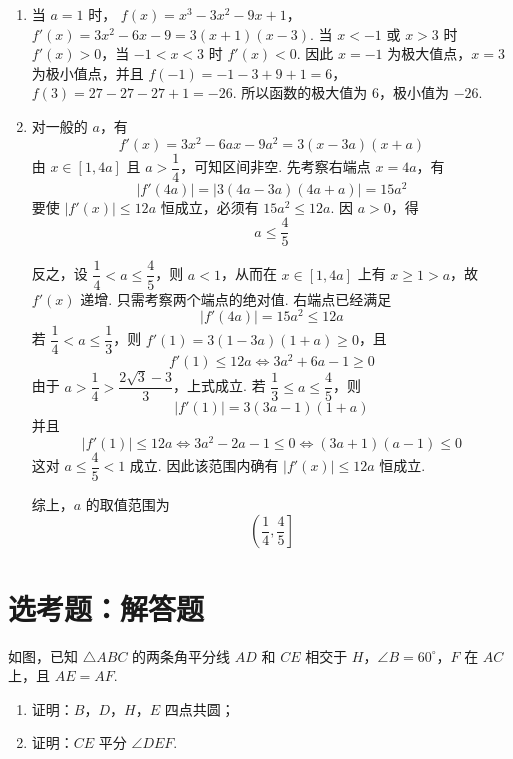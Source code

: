 \begin{solution}
\begin{enumerate}
\item 当 \(a=1\) 时，
\(f(x)=x^3-3x^2-9x+1\)，\(f'(x)=3x^2-6x-9=3(x+1)(x-3)\).
当 \(x<-1\) 或 \(x>3\) 时 \(f'(x)>0\)，当 \(-1<x<3\) 时 \(f'(x)<0\). 因此 \(x=-1\) 为极大值点，\(x=3\) 为极小值点，并且
\(f(-1)=-1-3+9+1=6\)，\(f(3)=27-27-27+1=-26\).
所以函数的极大值为 \(6\)，极小值为 \(-26\).

\item 对一般的 \(a\)，有
\[
f'(x)=3x^2-6ax-9a^2=3(x-3a)(x+a)
\]
由 \(x\in[1,4a]\) 且 \(a>\dfrac14\)，可知区间非空. 先考察右端点 \(x=4a\)，有
\[
|f'(4a)|=|3(4a-3a)(4a+a)|=15a^2
\]
要使 \(|f'(x)|\leqslant12a\) 恒成立，必须有 \(15a^2\leqslant12a\). 因 \(a>0\)，得
\[
a\leqslant\frac45
\]

反之，设 \(\dfrac14<a\leqslant\dfrac45\)，则 \(a<1\)，从而在 \(x\in[1,4a]\) 上有 \(x\geqslant1>a\)，故 \(f'(x)\) 递增. 只需考察两个端点的绝对值. 右端点已经满足
\[
|f'(4a)|=15a^2\leqslant12a
\]
若 \(\dfrac14<a\leqslant\dfrac13\)，则 \(f'(1)=3(1-3a)(1+a)\geqslant0\)，且
\[
f'(1)\leqslant12a
\Longleftrightarrow 3a^2+6a-1\geqslant0
\]
由于 \(a>\dfrac14>\dfrac{2\sqrt3-3}{3}\)，上式成立. 若 \(\dfrac13\leqslant a\leqslant\dfrac45\)，则
\[
|f'(1)|=3(3a-1)(1+a)
\]
并且
\[
|f'(1)|\leqslant12a
\Longleftrightarrow 3a^2-2a-1\leqslant0
\Longleftrightarrow (3a+1)(a-1)\leqslant0
\]
这对 \(a\leqslant\dfrac45<1\) 成立. 因此该范围内确有 \(|f'(x)|\leqslant12a\) 恒成立.

综上，\(a\) 的取值范围为
\[
\left(\frac14,\frac45\right]
\]
\end{enumerate}
\end{solution}

\section{选考题：解答题}

\begin{problem}
如图，已知 \(\triangle ABC\) 的两条角平分线 \(AD\) 和 \(CE\) 相交于 \(H\)，\(\angle B = 60^{\circ}\)，\(F\) 在 \(AC\) 上，且 \(AE = AF\).

\begin{enumerate}
\item 证明：\(B\)，\(D\)，\(H\)，\(E\) 四点共圆；
\item 证明：\(CE\) 平分 \(\angle DEF\).
\end{enumerate}

\FloatBarrier
\end{problem}

